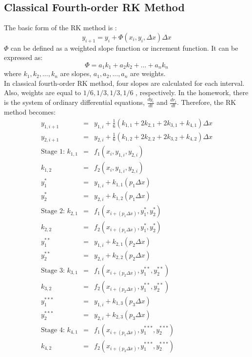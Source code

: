 \documentclass[letterpaper,12pt]{article}
\begin{document}
\subsection{Classical Fourth-order RK Method}
The basic form of the RK method is :
\begin{equation}
	y_{i+1} = y_i + \Phi(x_i, y_i, \Delta x) \Delta x
	\label{eqn:rk}  
\end{equation} 
$\Phi$ can be defined as a weighted slope function or increment function. It can be expressed as:
\begin{equation}
	\Phi = a_1k_1 + a_2k_2 + ... + a_nk_n
\end{equation}
where $k_1, k_2, ..., k_n$ are slopes, $a_1, a_2, ..., a_n$ are weights.\\
In classical fourth-order RK method, four slopes are calculated for each interval. Also, weights are equal to $1/6, 1/3, 1/3, 1/6$
, respectively. In the homework, there is the system of ordinary differential equations, $\frac{dy_i}{dt}$ and $\frac{dr_i}{dt}$. 
Therefore, the RK method becomes:
\begin{eqnarray}
	y_{1,i+1}&=&y_{1,i} + \frac{1}{6}(k_{1,1} + 2k_{2,1} + 2k_{3,1} + k_{4,1})\Delta x \nonumber \\
	y_{2,i+1}&=&y_{2,i} + \frac{1}{6}(k_{1,2} + 2k_{2,2} + 2k_{3,2} + k_{4,2})\Delta x \nonumber \\
	\mbox{Stage 1: }k_{1,1}&=&f_1(x_i, y_{1,i}, y_{2,i} ) \nonumber \\
	k_{1,2}&=&f_2(x_i, y_{1,i}, y_{2,i}) \nonumber \\
	y^{*}_1 &=& y_{1,i} + k_{1,1}(p_1\Delta x) \nonumber \\
	y^{*}_2 &=& y_{2,i} + k_{1,2}(p_1\Delta x) \nonumber \\
	\mbox{Stage 2: }k_{2,1}&=&f_1(x_{i+(p_1\Delta x)} ,y^{*}_1, y^{*}_2 ) \nonumber \\
	k_{2,2}&=&f_2(x_{i+(p_1\Delta x)} ,y^{*}_1, y^{*}_2 ) \nonumber \\
	y^{**}_1&=&y_{1,i} + k_{2,1}(p_2\Delta x) \nonumber \\
	y^{**}_2&=&y_{2,i} + k_{2,2}(p_2\Delta x) \nonumber \\
	\mbox{Stage 3: }k_{3,1}&=&f_1(x_{i+(p_2\Delta x)} ,y^{**}_1, y^{**}_2 ) \nonumber \\
	k_{3,2}&=&f_2(x_{i+(p_2\Delta x)} ,y^{**}_1, y^{**}_2 ) \nonumber \\
	y^{***}_1&=&y_{1,i} + k_{1,3}(p_3\Delta x) \nonumber \\
	y^{***}_2&=&y_{2,i} + k_{2,3}(p_3\Delta x) \nonumber \\
	\mbox{Stage 4: }k_{4,1}&=&f_1(x_{i+(p_1\Delta x)} ,y^{***}_1, y^{***}_2 ) \nonumber \\
	k_{4,2}&=&f_2(x_{i+(p_3\Delta x)} ,y^{***}_1, y^{***}_2 ) \nonumber
\end{eqnarray}
\end{document}
